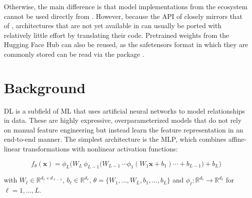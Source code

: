 \documentclass[article,shortnames]{jss}
\theoremstyle{definition}
\begin{document}
Otherwise, the main difference is that model implementations from the \python{} ecosystem cannot be used directly from \rlang{}.
However, because the API of \torch{} closely mirrors that of \pytorch{}, architectures that are not yet available in \rlang{} can usually be ported with relatively little effort by translating their \pytorch{} code.
Pretrained weights from the Hugging Face Hub can also be reused, as the safetensors format in which they are commonly stored can be read via the  package \citep{ref-safetensors}.

\section{Background}\label{sec:background}



DL is a subfield of ML that uses artificial neural networks to model relationships in data.
These are highly expressive, overparameterized models that do not rely on manual feature engineering but instead learn the feature representation in an end-to-end manner.
The simplest architecture is the MLP, which combines affine-linear transformations with nonlinear activation functions:

\begin{equation}\label{eq:mlp}
f_{\theta}(\mathbf{x})
= \phi_{L}\!\bigl(
  W_{L}\,\phi_{L-1}\!\bigl(
    W_{L-1}\,\dotsm \phi_{1}(W_{1}\mathbf{x}+b_{1}) \dotsm + b_{L-1}
  \bigr) + b_{L}
\bigr)
\end{equation}

\noindent with $W_{\ell}\in\mathbb{R}^{d_{\ell}\times d_{\ell-1}}$, $b_{\ell}\in\mathbb{R}^{d_{\ell}}$, $\theta = \{W_1, \ldots, W_L, b_1, \ldots, b_L\}$ and $\phi_{\ell}: \mathbb{R}^{d_{\ell}} \rightarrow \mathbb{R}^{d_{\ell}}$ for $\ell=1,\dots,L$.
\end{document}
